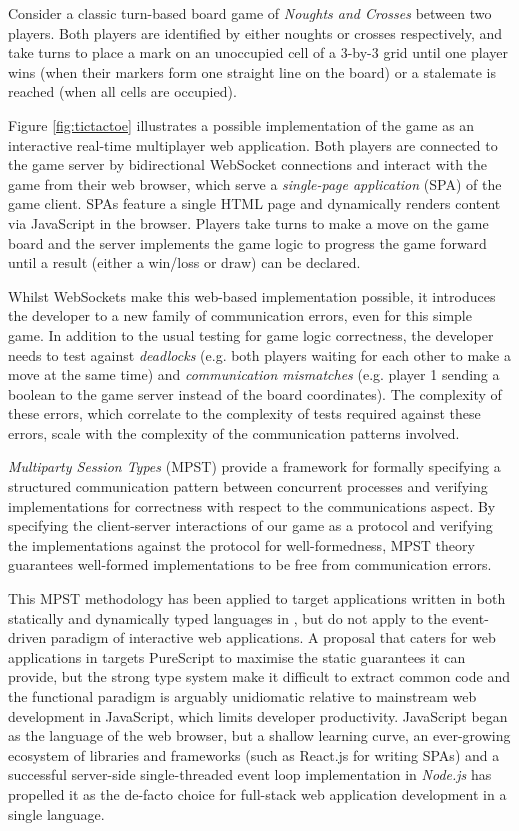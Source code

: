 \documentclass[submission,copyright,creativecommons]{eptcs}
\begin{document}
Consider a classic turn-based board game of \textit{Noughts and Crosses} between two players. Both players are identified by either noughts or crosses respectively, and take turns to place a mark on an unoccupied cell of a 3-by-3 grid until one player wins (when their markers form one straight line on the board) or a stalemate is reached (when all cells are occupied).

Figure \ref{fig:tictactoe} illustrates a possible implementation of the game as an interactive real-time multiplayer web application. Both players are connected to the game server by bidirectional WebSocket connections and interact with the game from their web browser, which serve a \textit{single-page application} (SPA) of the game client. SPAs feature a single HTML page and dynamically renders content via JavaScript in the browser. Players take turns to make a move on the game board and the server implements the game logic to progress the game forward until a result (either a win/loss or draw) can be declared. 

Whilst WebSockets make this web-based implementation possible, it introduces the developer to a new family of communication errors, even for this simple game. In addition to the usual testing for game logic correctness, the developer needs to test against \textit{deadlocks} (e.g. both players waiting for each other to make a move at the same time) and \textit{communication mismatches} (e.g. player 1 sending a boolean to the game server instead of the board coordinates). The complexity of these errors, which correlate to the complexity of tests required against these errors, scale with the complexity of the communication patterns involved.

\textit{Multiparty Session Types} (MPST) \cite{MPST} provide a framework for formally specifying a structured communication pattern between concurrent processes and verifying implementations for correctness with respect to the communications aspect. By specifying the client-server interactions of our game as a protocol and verifying the implementations against the protocol for well-formedness, MPST theory guarantees well-formed implementations to be free from communication errors.

This MPST methodology has been applied to target applications written in both statically and dynamically typed languages in \cite{Hybrid2016, Python2017}, but do not apply to the event-driven paradigm of interactive web applications. A proposal that caters for web applications in \cite{PureScript2019} targets PureScript to maximise the static guarantees it can provide, but the strong type system make it difficult to extract common code and the functional paradigm is arguably unidiomatic relative to mainstream web development in JavaScript, which limits developer productivity. JavaScript began as the language of the web browser, but a shallow learning curve, an ever-growing ecosystem of libraries and frameworks (such as React.js for writing SPAs) and a successful server-side single-threaded event loop implementation in \textit{Node.js} has propelled it as the de-facto choice for full-stack web application development in a single language. 
\end{document}
